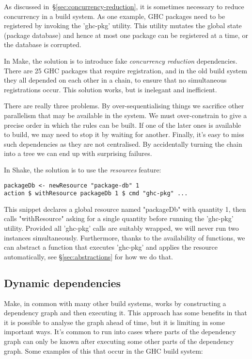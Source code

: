 As discussed in~\S\ref{sec:concurrency-reduction}, it is sometimes necessary to
reduce concurrency in a build system. As one example, GHC packages need to
be registered by invoking the \lst'ghc-pkg' utility. This utility mutates the
global state (package database) and hence at most one package can be registered
at a time, or the database is corrupted.

In Make, the solution is to introduce fake \emph{concurrency
reduction} dependencies. There are 25 GHC packages that require registration,
and in the old build system they all depended on each other in a chain, to
ensure that no simultaneous registrations occur. This solution works, but is
inelegant and inefficient.

There are really three problems. By over-sequentialising things we sacrifice
other parallelism that may be available in the system. We must over-constrain to
give a precise order in which the rules can be built. If one of the later ones
is available to build, we may need to stop it by waiting for another. Finally,
it's easy to miss such dependencies as they are not centralised. By accidentally
turning the chain into a tree we can end up with surprising failures.

In Shake, the solution is to use the \emph{resources} feature:

\begin{lstlisting}
packageDb <- newResource "package-db" 1
action $ withResource packageDb 1 $ cmd "ghc-pkg" ...
\end{lstlisting}

This snippet declares a global resource named \lst"packageDb" with quantity 1,
then calls \lst"withResource" asking for a single quantity before running the
\lst'ghc-pkg' utility. Provided all \lst'ghc-pkg' calls are suitably wrapped,
we will never run two instances simultaneously. Furthermore, thanks to the
availability of functions, we can abstract a function that executes
\lst'ghc-pkg' and applies the resource automatically, see
\S\ref{sec:abstractions} for how we do that.

\subsection{Dynamic dependencies\label{sec:dynamic-deps}}

Make, in common with many other build systems, works by
constructing a dependency graph and then executing it. This approach
has some benefits in that it is possible to analyse the graph ahead of
time, but it is limiting in some important ways.  It's common to run
into cases where parts of the dependency graph can only be known after
executing some other parts of the dependency graph.  Some examples of
this that occur in the GHC build system:

